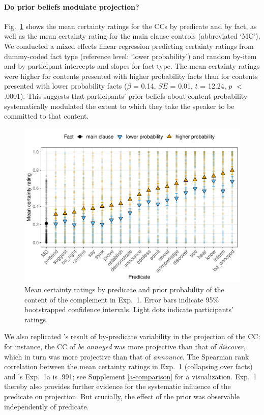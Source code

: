 \documentclass[11pt,fleqn]{article}
\newcommand{\figref}[1]{Fig.~\ref{#1}}
\newcommand{\6}{\mbox{$[\hspace*{-.6mm}[$}}
\newcommand{\9}{\mbox{$]\hspace*{-.6mm}]$}}
\newcommand{\citepos}[1]{\citeauthor{#1}'s \citeyear{#1}}
\begin{document}
\paragraph{Do prior beliefs modulate projection?}  \figref{f-projection-mean} shows the mean certainty ratings for the CCs by  predicate and by fact, as well as the mean certainty rating for the main clause controls (abbreviated `MC'). We conducted a mixed effects linear regression predicting certainty ratings from dummy-coded fact type (reference level: `lower probability') and random by-item and by-participant intercepts and slopes for fact type. The mean certainty ratings were higher for contents  presented with higher probability facts than for contents presented with lower probability facts ($\beta$ = 0.14, $SE$ = 0.01, $t$ = 12.24, $p$ $<$ .0001).   This %
suggests that participants' prior beliefs about content probability systematically modulated the extent to which they take the speaker to be committed to that content.

\begin{figure}[h!]
\centering

\includegraphics[width=.7\paperwidth]{../../results/9-prior-projection/graphs/means-projectivity-by-predicate-and-prior}

\caption{Mean certainty ratings by predicate and prior probability of the content of the complement in Exp.~1. Error bars indicate 95\% bootstrapped confidence intervals. Light dots indicate participants' ratings.} 
\label{f-projection-mean}
\end{figure}

We also replicated 's result of by-predicate variability in the projection of the CC: for instance, the CC of {\em be annoyed} was more projective than that of {\em discover}, which in turn was more projective than that of {\em announce}. The Spearman rank correlation between the mean certainty ratings in Exp.~1 (collapsing over facts) and \citepos{tonhauser-degen-factive} Exp.~1a is .991; see Supplement \ref{a-comparison} for a visualization. Exp.~1 thereby also provides further evidence for the systematic influence of the predicate on projection. But crucially, the effect of the prior was observable independently of predicate.
\end{document}
